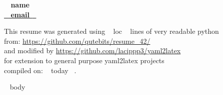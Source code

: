 \documentclass[11pt,english]{article}
\begin{document}

\begin{center}
\huge\bf\color{maincolor} ~{{ name }}~  \\
\small\color{black} \href{mailto: ~{{ email }}~ }{ ~{{ email }}~ } 
\end{center}

\begin{flushright}
\vspace{3.5mm}
\tiny This resume was generated using ~{{ loc }}~ lines of very readable python\\
\tiny from: \url{https://github.com/qutebits/resume\_42/}\\
\tiny and modified by \url{https://github.com/lacippp3/yaml2latex} \\
\tiny for extension to general purpose yaml2latex projects \\
\tiny compiled on: ~{{ today }}~.
\end{flushright}

\vspace{-18mm}

~{{ body }}~
\end{document}
